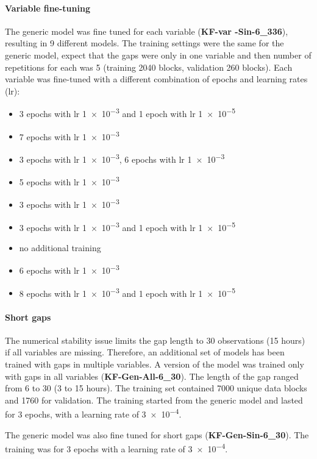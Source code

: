 \documentclass{article}
\begin{document}
\paragraph{Variable fine-tuning} The generic model was fine tuned for each variable (\textbf{KF-\textlangle var \textrangle-Sin-6\_336}), resulting in 9 different models. The training settings were the same for the generic model, expect that the gaps were only in one variable and then number of repetitions for each was 5 (training 2040 blocks, validation 260 blocks). Each variable was fine-tuned with a different combination of epochs and learning rates (lr):
\begin{itemize}
    \item {} 3 epochs with lr \num{1e-3} and 1 epoch with lr \num{1e-5}
    \item {} \num{7} epochs with lr \num{1e-3}
    \item {} \num{3} epochs with lr \num{1e-3},  \num{6} epochs with lr \num{1e-3}
    \item {} \num{5} epochs with lr \num{1e-3}
    \item {} \num{3} epochs with lr \num{1e-3}
    \item {} \num{3} epochs with lr \num{1e-3} and 1 epoch with lr \num{1e-5}
    \item {} no additional training
    \item  {} \num{6} epochs with lr \num{1e-3}
    \item {} \num{8} epochs with lr \num{1e-3} and 1 epoch with lr \num{1e-5}
\end{itemize}

\paragraph{Short gaps} The numerical stability issue limits the gap length to 30 observations (15 hours) if all variables are missing. Therefore, an additional set of models has been trained with gaps in multiple variables.
A version of the model was trained only with gaps in all variables (\textbf{KF-Gen-All-6\_30}). The length of the gap ranged from 6 to 30 (3 to 15 hours). The training set contained 7000 unique data blocks and 1760 for validation. The training started from the generic model and lasted for 3 epochs, with a learning rate of \num{3e-4}.

The generic model was also fine tuned for short gaps (\textbf{KF-Gen-Sin-6\_30}). The training was for 3 epochs with a learning rate of \num{3e-4}.
\end{document}
